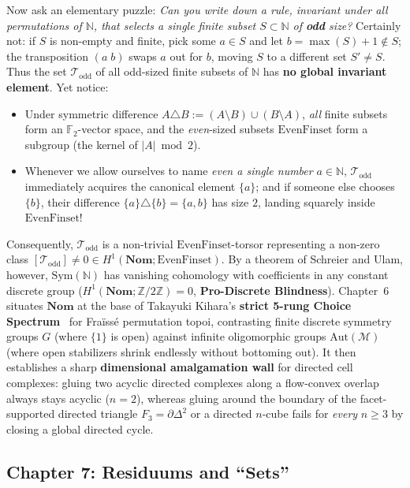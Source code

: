 \documentclass[10pt,twoside,openright]{book}
\theoremstyle{crmplain}
\theoremstyle{crmdef}
\theoremstyle{crmremark}
\begin{document}
Now ask an elementary puzzle: \emph{Can you write down a rule, invariant under all permutations of $\mathbb{N}$, that selects a single finite subset $S \subset \mathbb{N}$ of \textbf{odd} size?}
Certainly not: if $S$ is non-empty and finite, pick some $a \in S$ and let $b = \max(S) + 1 \notin S$; the transposition $(a \; b)$ swaps $a$ out for $b$, moving $S$ to a different set $S' \neq S$. Thus the set $\mathcal{T}_{\mathrm{odd}}$ of all odd-sized finite subsets of $\mathbb{N}$ has \textbf{no global invariant element}. Yet notice:
\begin{itemize}
  \item Under symmetric difference $A \triangle B := (A \setminus B) \cup (B \setminus A)$, \emph{all} finite subsets form an $\mathbb{F}_2$-vector space, and the \emph{even}-sized subsets $\mathrm{EvenFinset}$ form a subgroup (the kernel of $|A| \bmod 2$).
  \item Whenever we allow ourselves to name \emph{even a single number} $a \in \mathbb{N}$, $\mathcal{T}_{\mathrm{odd}}$ immediately acquires the canonical element $\{a\}$; and if someone else chooses $\{b\}$, their difference $\{a\} \triangle \{b\} = \{a, b\}$ has size $2$, landing squarely inside $\mathrm{EvenFinset}$!
\end{itemize}

Consequently, $\mathcal{T}_{\mathrm{odd}}$ is a non-trivial $\mathrm{EvenFinset}$-torsor representing a non-zero class $[\mathcal{T}_{\mathrm{odd}}] \neq 0 \in H^1(\mathbf{Nom}; \mathrm{EvenFinset})$. By a theorem of Schreier and Ulam, however, $\mathrm{Sym}(\mathbb{N})$ has vanishing cohomology with coefficients in any constant discrete group ($H^1(\mathbf{Nom}; \mathbb{Z}/2\mathbb{Z}) = 0$, \textbf{Pro-Discrete Blindness}). Chapter~6 situates $\mathbf{Nom}$ at the base of Takayuki Kihara's \textbf{strict 5-rung Choice Spectrum}~\cite{Kihara26} for Fra\"iss\'e permutation topoi, contrasting finite discrete symmetry groups $G$ (where $\{1\}$ is open) against infinite oligomorphic groups $\mathrm{Aut}(\mathcal{M})$ (where open stabilizers shrink endlessly without bottoming out). It then establishes a sharp \textbf{dimensional amalgamation wall} for directed cell complexes: gluing two acyclic directed complexes along a flow-convex overlap always stays acyclic ($n = 2$), whereas gluing around the boundary of the facet-supported directed triangle $F_3 = \partial\Delta^2$ or a directed $n$-cube fails for \emph{every} $n \ge 3$ by closing a global directed cycle.

\subsection*{Chapter 7: Residuums and ``$\mathbf{Sets}$''}
\end{document}
